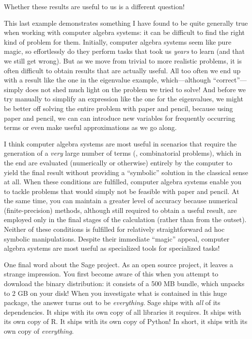 Whether these results are useful to us is a different question!

This last example demonstrates something I have found to be quite
generally true when working with computer algebra systems: it can be
difficult to find the right kind of problem for them. Initially,
computer algebra systems seem like pure magic, so effortlessly do they
perform tasks that took us \emph{years} to learn (and that we still
get wrong). But as we move from trivial to more realistic problems, it
is often difficult to obtain results that are actually useful. All too
often we end up with a result like the one in the eigenvalue
example, which---although ``correct''---simply does not shed much
light on the problem we tried to solve!  And before we try manually to
simplify an expression like the one for the eigenvalues, we might be
better off solving the entire problem with paper and pencil, because
using paper and pencil, we can can introduce new variables for
frequently occurring terms or even make useful approximations as we
go along.

I think computer algebra systems are most useful in scenarios that
require the generation of a \emph{very} large number of terms (\eg,
combinatorial problems), which in the end are evaluated (numerically
or otherwise) entirely by the computer to yield the final result
without providing a ``symbolic'' solution in the classical sense at
all. When these conditions are fulfilled, computer algebra systems
enable you to tackle problems that would simply not be feasible with
paper and pencil. At the same time, you can maintain a greater level
of accuracy because numerical (finite-precision) methods, although
still required to obtain a useful result, are employed only in the
final stages of the calculation (rather than from the outset).\vadjust{\pagebreak} Neither
of these conditions is fulfilled for relatively straightforward ad hoc
symbolic manipulations. Despite their immediate ``magic'' appeal,
computer algebra systems are most useful as specialized tools for
specialized tasks!

One final word about the Sage project.  As an open source project, it
leaves a strange impression. You first become aware of this when you
attempt to download the binary distribution: it consists of a 500 MB
bundle, which unpacks to 2 GB on your disk! When you investigate what
is contained in this huge package, the answer turns out to be
\emph{everything}. Sage ships with \emph{all} of its dependencies. It
ships with its own copy of all libraries it requires. It ships with
its own copy of R. It ships with its own copy of Python!  In short, it
ships with its own copy of \emph{everything}.

